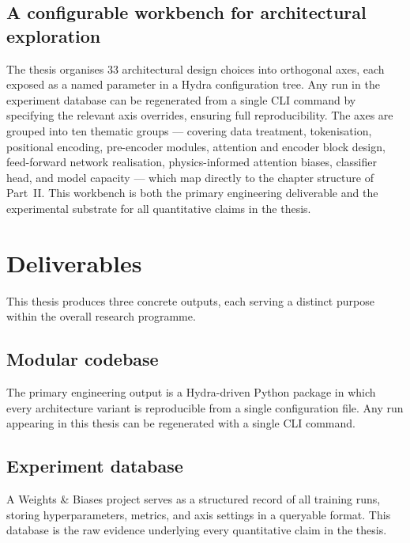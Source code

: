 \subsection{A configurable workbench for architectural exploration}
\label{subsec:intro_workbench}

The thesis organises 33 architectural design choices into orthogonal axes, each exposed as a named parameter in a Hydra configuration tree.
Any run in the experiment database can be regenerated from a single CLI command by specifying the relevant axis overrides, ensuring full reproducibility.
The axes are grouped into ten thematic groups --- covering data treatment, tokenisation, positional encoding, pre-encoder modules, attention and encoder block design, feed-forward network realisation, physics-informed attention biases, classifier head, and model capacity --- which map directly to the chapter structure of Part~II.
This workbench is both the primary engineering deliverable and the experimental substrate for all quantitative claims in the thesis.


\section{Deliverables}
\label{sec:intro_deliverables}

This thesis produces three concrete outputs, each serving a distinct purpose within the overall research programme.

\subsection{Modular codebase}
\label{subsec:intro_codebase}

The primary engineering output is a Hydra-driven Python package in which every architecture variant is reproducible from a single configuration file.
Any run appearing in this thesis can be regenerated with a single CLI command.

\subsection{Experiment database}
\label{subsec:intro_experiment_database}

A Weights \& Biases project serves as a structured record of all training runs, storing hyperparameters, metrics, and axis settings in a queryable format.
This database is the raw evidence underlying every quantitative claim in the thesis.

